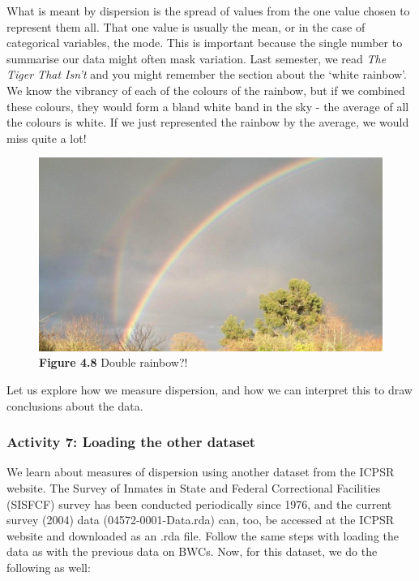 \documentclass[
]{book}
\begin{document}
What is meant by dispersion is the spread of values from the one value chosen to represent them all. That one value is usually the mean, or in the case of categorical variables, the mode. This is important because the single number to summarise our data might often mask variation. Last semester, we read \emph{The Tiger That Isn't} and you might remember the section about the `white rainbow'. We know the vibrancy of each of the colours of the rainbow, but if we combined these colours, they would form a bland white band in the sky - the average of all the colours is white. If we just represented the rainbow by the average, we would miss quite a lot!

\begin{figure}
\centering
\includegraphics{Images/rainbow.jpg}
\caption{\textbf{Figure 4.8} Double rainbow?!}
\end{figure}

Let us explore how we measure dispersion, and how we can interpret this to draw conclusions about the data.

\hypertarget{activity-7-loading-the-other-dataset}{%
\subsubsection{Activity 7: Loading the other dataset}\label{activity-7-loading-the-other-dataset}}

We learn about measures of dispersion using another dataset from the ICPSR website. The Survey of Inmates in State and Federal Correctional Facilities (SISFCF) survey has been conducted periodically since 1976, and the current survey (2004) data (04572-0001-Data.rda) can, too, be accessed at the ICPSR website and downloaded as an .rda file. Follow the same steps with loading the data as with the previous data on BWCs. Now, for this dataset, we do the following as well:
\end{document}

